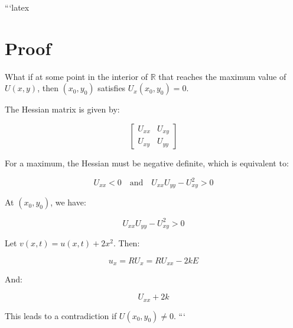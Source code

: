 ```latex
\section*{Proof}

What if at some point in the interior of $\mathbb{R}$ that reaches the maximum value of $U(x, y)$, then $(x_0, y_0)$ satisfies $U_x(x_0, y_0) = 0$.

The Hessian matrix is given by:

\[
\begin{bmatrix}
U_{xx} & U_{xy} \\
U_{xy} & U_{yy}
\end{bmatrix}
\]

For a maximum, the Hessian must be negative definite, which is equivalent to:

\[
U_{xx} < 0 \quad \text{and} \quad U_{xx}U_{yy} - U_{xy}^2 > 0
\]

At $(x_0, y_0)$, we have:

\[
U_{xx}U_{yy} - U_{xy}^2 > 0
\]

Let $v(x, t) = u(x, t) + 2x^2$. Then:

\[
u_x = R U_x = R U_{xx} - 2kE
\]

And:

\[
U_{xx} + 2k
\]

This leads to a contradiction if $U(x_0, y_0) \neq 0$.
```

